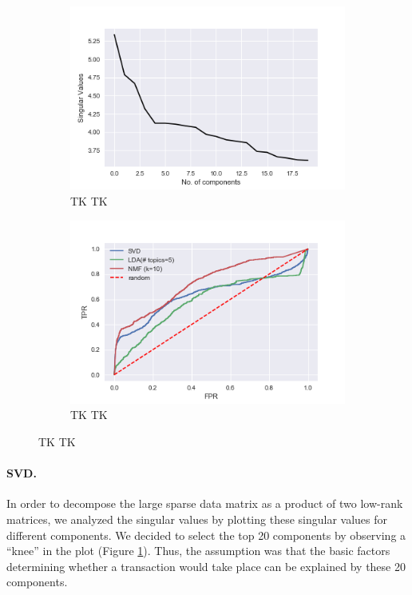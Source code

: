 \documentclass{article} %
\begin{document}
\begin{figure}
\centering
\begin{subfigure}{.5\textwidth}
    \centering
    \includegraphics[width=1\linewidth]{figures/singular_values_log_yscale}
    \caption{\small TK TK}
    \label{fig:svd}
\end{subfigure}%
\begin{subfigure}{.5\textwidth}
    \centering
    \includegraphics[width=1\linewidth]{figures/roc}
    \caption{\small TK TK}
    \label{fig:roc}
\end{subfigure}
\caption{\small TK TK}
\label{fig:test}
\end{figure}

\paragraph{SVD.} In order to decompose the large sparse data matrix as a product of two low-rank matrices, we analyzed the singular values by plotting these singular values for different components. We decided to select the top 20 components by observing a ``knee'' in the plot (Figure \ref{fig:svd}). Thus, the assumption was that the basic factors determining whether a transaction would take place can be explained by these 20 components.
\end{document}
